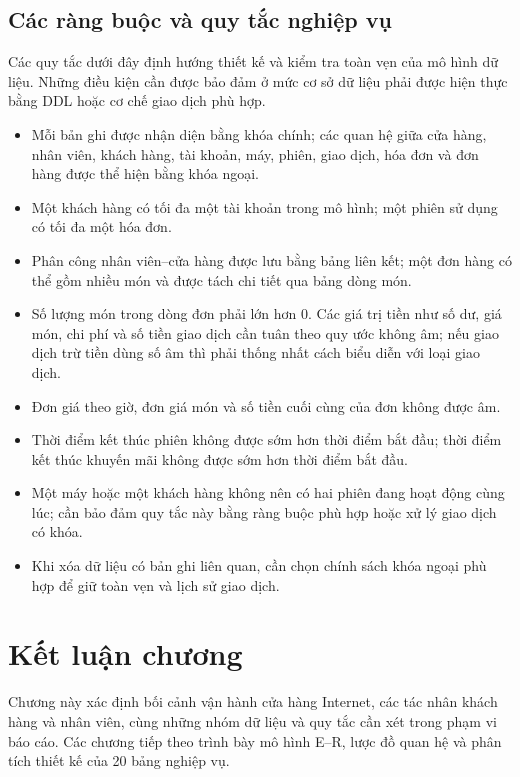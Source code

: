 \subsection{Các ràng buộc và quy tắc nghiệp vụ}
Các quy tắc dưới đây định hướng thiết kế và kiểm tra toàn vẹn của mô hình dữ liệu. Những điều kiện cần được bảo đảm ở mức cơ sở dữ liệu phải được hiện thực bằng DDL hoặc cơ chế giao dịch phù hợp.
\begin{itemize}
  \item Mỗi bản ghi được nhận diện bằng khóa chính; các quan hệ giữa cửa hàng, nhân viên, khách hàng, tài khoản, máy, phiên, giao dịch, hóa đơn và đơn hàng được thể hiện bằng khóa ngoại.
  \item Một khách hàng có tối đa một tài khoản trong mô hình; một phiên sử dụng có tối đa một hóa đơn.
  \item Phân công nhân viên--cửa hàng được lưu bằng bảng liên kết; một đơn hàng có thể gồm nhiều món và được tách chi tiết qua bảng dòng món.
  \item Số lượng món trong dòng đơn phải lớn hơn 0. Các giá trị tiền như số dư, giá món, chi phí và số tiền giao dịch cần tuân theo quy ước không âm; nếu giao dịch trừ tiền dùng số âm thì phải thống nhất cách biểu diễn với loại giao dịch.
  \item Đơn giá theo giờ, đơn giá món và số tiền cuối cùng của đơn không được âm.
  \item Thời điểm kết thúc phiên không được sớm hơn thời điểm bắt đầu; thời điểm kết thúc khuyến mãi không được sớm hơn thời điểm bắt đầu.
  \item Một máy hoặc một khách hàng không nên có hai phiên đang hoạt động cùng lúc; cần bảo đảm quy tắc này bằng ràng buộc phù hợp hoặc xử lý giao dịch có khóa.
  \item Khi xóa dữ liệu có bản ghi liên quan, cần chọn chính sách khóa ngoại phù hợp để giữ toàn vẹn và lịch sử giao dịch.
\end{itemize}

\section{Kết luận chương}
Chương này xác định bối cảnh vận hành cửa hàng Internet, các tác nhân khách hàng và nhân viên, cùng những nhóm dữ liệu và quy tắc cần xét trong phạm vi báo cáo. Các chương tiếp theo trình bày mô hình E--R, lược đồ quan hệ và phân tích thiết kế của 20 bảng nghiệp vụ.
